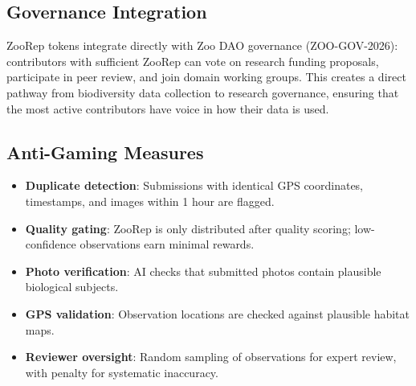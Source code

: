 \subsection{Governance Integration}

ZooRep tokens integrate directly with Zoo DAO governance (ZOO-GOV-2026):
contributors with sufficient ZooRep can vote on research funding
proposals, participate in peer review, and join domain working groups.
This creates a direct pathway from biodiversity data collection to
research governance, ensuring that the most active contributors have
voice in how their data is used.

\subsection{Anti-Gaming Measures}

\begin{itemize}
  \item \textbf{Duplicate detection}: Submissions with identical GPS
    coordinates, timestamps, and images within 1 hour are flagged.
  \item \textbf{Quality gating}: ZooRep is only distributed after
    quality scoring; low-confidence observations earn minimal rewards.
  \item \textbf{Photo verification}: AI checks that submitted photos
    contain plausible biological subjects.
  \item \textbf{GPS validation}: Observation locations are checked
    against plausible habitat maps.
  \item \textbf{Reviewer oversight}: Random sampling of observations
    for expert review, with penalty for systematic inaccuracy.
\end{itemize}


